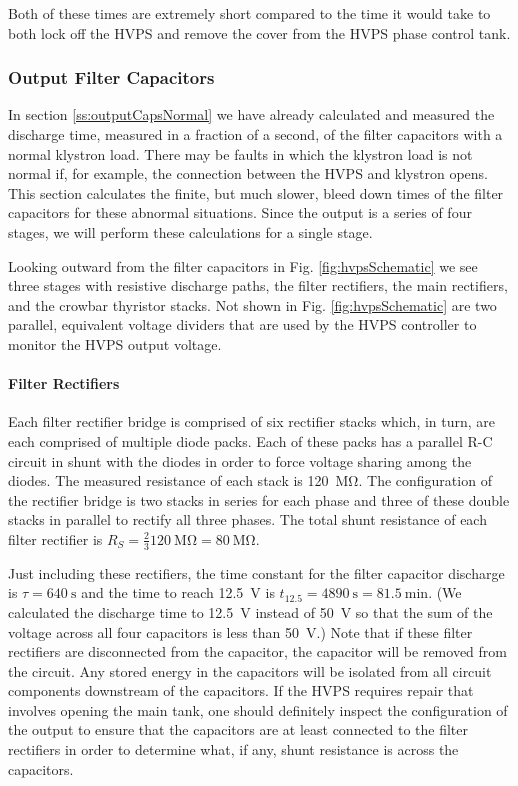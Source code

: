 \documentclass[letterpaper,11pt]{article}
\begin{document}
Both of these times are extremely short compared to the time it would take to both lock off the HVPS and remove the cover from the HVPS phase control tank.

\subsubsection{Output Filter Capacitors}
In section \ref{ss:outputCapsNormal} we have already calculated and measured the discharge time, measured in a fraction of a second, of the filter capacitors with a normal klystron load.  There may be faults in which the klystron load is not normal if, for example, the connection between the HVPS and klystron opens.  This section calculates the finite, but much slower, bleed down times of the filter capacitors for these abnormal situations.  Since the output is a series of four stages, we will perform these calculations for a single stage.

Looking outward from the filter capacitors in Fig. \ref{fig:hvpsSchematic} we see three stages with resistive discharge paths, the filter rectifiers, the main rectifiers, and the crowbar thyristor stacks.  Not shown in Fig. \ref{fig:hvpsSchematic} are two parallel, equivalent voltage dividers that are used by the HVPS controller to monitor the HVPS output voltage.

\paragraph{Filter Rectifiers}
Each filter rectifier bridge is comprised of six rectifier stacks which, in turn, are each comprised of multiple diode packs.  Each of these packs has a parallel R-C circuit in shunt with the diodes in order to force voltage sharing among the diodes.  The measured resistance of each stack is \SI{120}{\mega\ohm}.  The configuration of the rectifier bridge is two stacks in series for each phase and three of these double stacks in parallel to rectify all three phases.  The total shunt resistance of each filter rectifier is $R_{S} = \frac{2}{3}\SI{120}{\mega\ohm} = \SI{80}{\mega\ohm}$.

Just including these rectifiers, the time constant for the filter capacitor discharge is $\tau = \SI{640}{\second}$ and the time to reach \SI{12.5}{\volt} is $t_{12.5} = \SI{4890}{\second} = \SI{81.5}{\minute}$.  (We calculated the discharge time to \SI{12.5}{\volt} instead of \SI{50}{\volt} so that the sum of the voltage across all four capacitors is less than \SI{50}{\volt}.)  Note that if these filter rectifiers are disconnected from the capacitor, the capacitor will be removed from the circuit.  Any stored energy in the capacitors will be isolated from all circuit components downstream of the capacitors.  If the HVPS requires repair that involves opening the main tank, one should definitely inspect the configuration of the output to ensure that the capacitors are at least connected to the filter rectifiers in order to determine what, if any, shunt resistance is across the capacitors.
\end{document}
